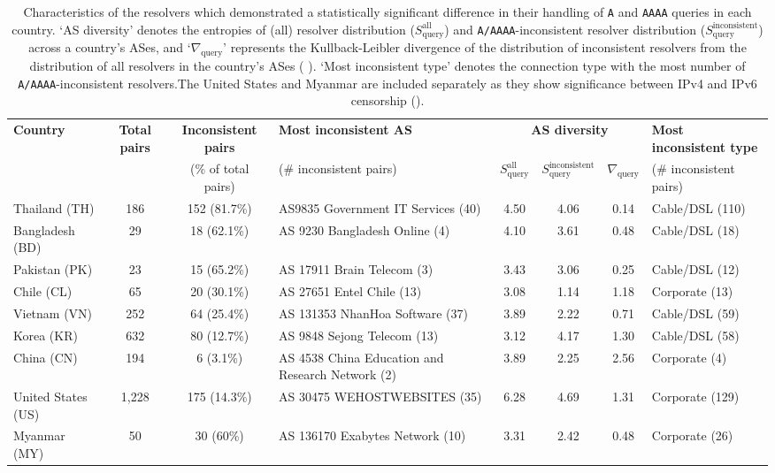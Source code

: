 \begin{table*}[t]
  \centering
  \small
  \scalebox{\tabularscale} {
    \begin{tabular}{lcclcccl}
    \toprule
      {\bf Country} & {\bf Total pairs} & {\bf Inconsistent pairs} & {\bf Most inconsistent AS} & \multicolumn{3}{c}{\bf AS diversity} & {\bf Most inconsistent type} \\ 
      & & {(\% of total pairs)}& {(\# inconsistent pairs)} & $S^{\text{all}}_{\text{query}}$ & $S^{\text{inconsistent}}_{\text{query}}$ & $\nabla_{\text{query}}$  & {(\# inconsistent pairs)} \\
      \midrule
      Thailand (TH)       & 186 & 152 (81.7\%)  &  AS9835 Government IT Services (40)  & 4.50 & 4.06 & 0.14 & Cable/DSL (110) \\
      Bangladesh (BD)     & 29  & 18 (62.1\%) & AS 9230 Bangladesh Online (4)          & 4.10 & 3.61 & 0.48 & Cable/DSL (18) \\    
      Pakistan (PK)       & 23  & 15 (65.2\%) & AS 17911 Brain Telecom (3)             & 3.43 & 3.06 & 0.25 & Cable/DSL (12) \\    
      Chile (CL)          & 65  & 20 (30.1\%) & AS 27651 Entel Chile (13)              & 3.08 & 1.14 & 1.18 & Corporate (13) \\    
      Vietnam (VN)        & 252 & 64 (25.4\%) & AS 131353 NhanHoa Software (37)        & 3.89 & 2.22 & 0.71 & Cable/DSL (59) \\    
      Korea (KR)          & 632 & 80 (12.7\%) & AS 9848 Sejong Telecom (13)            & 3.12 & 4.17 & 1.30 & Cable/DSL (58) \\    
      China (CN)          & 194 & 6 (3.1\%)   & AS 4538 China Education and Research Network (2) & 3.89 & 2.25 & 2.56 & Corporate (4)   \\    
    \midrule
      United States (US)  & 1,228 & 175 (14.3\%)  & AS 30475 WEHOSTWEBSITES (35) & 6.28 & 4.69 & 1.31 & Corporate (129) \\    
      Myanmar (MY)        & 50  & 30 (60\%)   & AS 136170 Exabytes Network (10)  & 3.31 & 2.42 & 0.48 & Corporate (26) \\    
    \bottomrule
  \end{tabular}
  }
  \caption{Characteristics of the resolvers which demonstrated a statistically
  significant difference in their handling of {\tt A} and {\tt AAAA} queries in
  each country. 
  `AS diversity' denotes the entropies of (all) resolver distribution
  ($S^{\text{all}}_{\text{query}}$) and {\tt A/AAAA}-inconsistent resolver
  distribution ($S^{\text{inconsistent}}_{\text{query}}$) across a country's
  ASes, and `$\nabla_{\text{query}}$' represents the Kullback-Leibler
  divergence of the distribution of inconsistent resolvers from the
  distribution of all resolvers in the country's ASes (\cf
  ).
  `Most inconsistent type' denotes the connection type with the most number of
  {\tt A/AAAA}-inconsistent resolvers.The United States and Myanmar are included
  separately as they show significance between IPv4 and IPv6 censorship
  ().}
  \label{tab:resources:resolvers}
\end{table*}

